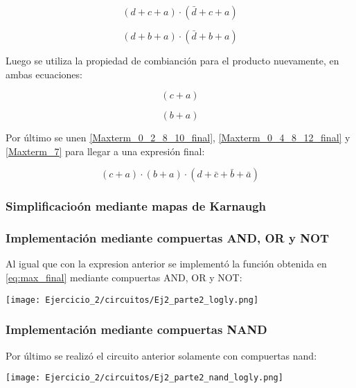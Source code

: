 \begin{equation}\label{Maxterm_0_2_8_10_simp}
(d + c + a) \cdot (\bar{d} + c + a) 
\end{equation}

\begin{equation}\label{Maxterm_0_4_8_12_simp}
(d + b +a) \cdot (\bar{d} + b + a)
\end{equation}

Luego se utiliza la propiedad de combianción para el producto nuevamente, en ambas ecuaciones:

\begin{equation}\label{Maxterm_0_2_8_10_final}
(c + a) 
\end{equation}

\begin{equation}\label{Maxterm_0_4_8_12_final}
(b +a)
\end{equation}

Por último se unen \ref{Maxterm_0_2_8_10_final}, \ref{Maxterm_0_4_8_12_final} y \ref{Maxterm_7} para llegar a una expresión final:

\begin{equation}\label{eq:max_final}
\boxed{(c + a) \cdot (b +a) \cdot (d + \bar{c} + \bar{b} + \bar{a})}
\end{equation}

\subsubsection{Simplificacioón mediante mapas de Karnaugh}


\subsubsection{Implementación mediante compuertas AND, OR y NOT}

Al igual que con la expresion anterior se implementó la función obtenida en \ref{eq:max_final} mediante compuertas AND, OR y NOT:

\texttt{[image: Ejercicio\_2/circuitos/Ej2\_parte2\_logly.png]}

\subsubsection{Implementación mediante compuertas NAND}
Por último se realizó el circuito anterior solamente con compuertas nand:

\texttt{[image: Ejercicio\_2/circuitos/Ej2\_parte2\_nand\_logly.png]}